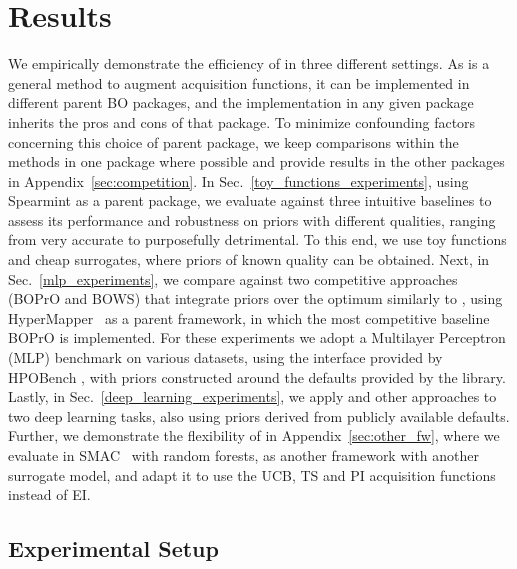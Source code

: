 \documentclass{article}
\newcommand{\method}[0]{\text{${\pi}$BO}\xspace}
\begin{document}
\section{Results} \label{results} 
We empirically demonstrate the efficiency of \method{} in three different settings. As \method{} is a general method to augment acquisition functions, it can be implemented in different parent BO packages, and the implementation in any given package inherits the pros and cons of that package. To minimize confounding factors concerning this choice of parent package, we keep comparisons within the methods in one package where possible and provide results in the other packages in Appendix~\ref{sec:competition}.
In Sec.~\ref{toy_functions_experiments}, 
using Spearmint as a parent package, 
we evaluate \method against three intuitive baselines to assess its performance and robustness on priors with different qualities, ranging from very accurate to purposefully detrimental. To this end, we use toy functions and cheap surrogates, where priors of known quality can be obtained. 
Next, in Sec.~\ref{mlp_experiments}, we compare \method{} against two competitive approaches (BOPrO and BOWS) that integrate priors over the optimum similarly to \method{}, using HyperMapper~\citep{nardi2019practical} as a parent framework, in which the most competitive baseline BOPrO is implemented. For these experiments we adopt a Multilayer Perceptron (MLP) benchmark on various datasets, using the interface provided by HPOBench \citep{eggensperger2021hpobench}, with priors constructed around the defaults provided by the library. 
Lastly, in Sec.~\ref{deep_learning_experiments}, we apply \method and other approaches to two deep learning tasks, also using priors derived from publicly available defaults. 
 Further, we demonstrate the flexibility of \method in Appendix~\ref{sec:other_fw}, where we evaluate \method in SMAC~\citep{smac,lindauer-arxiv21a} with random forests, as another framework with another surrogate model, and adapt it to use the UCB, TS and PI acquisition functions instead of EI.

\subsection{Experimental Setup}
\end{document}
